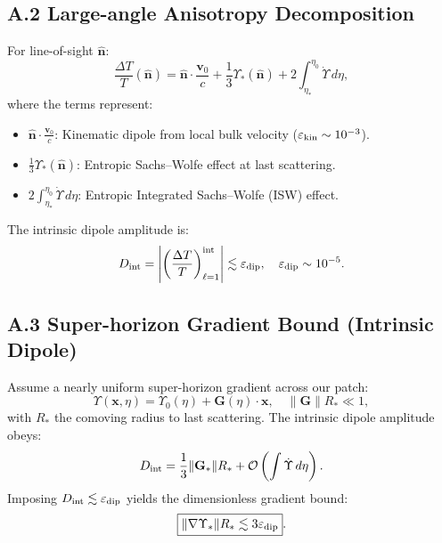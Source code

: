 \documentclass{article}
\begin{document}
{{\subsection*{A.2 Large-angle Anisotropy Decomposition}
For line-of-sight \(\hat{\mathbf{n}}\):
\begin{equation}
\frac{\Delta T}{T}(\hat{\mathbf{n}}) = \hat{\mathbf{n}} \cdot \frac{\mathbf{v}_0}{c} + \frac{1}{3} \Upsilon_*(\hat{\mathbf{n}}) + 2 \int_{\eta_*}^{\eta_0} \dot{\Upsilon} \, d\eta,
\label{eq:anisodecomp}
\end{equation}
where the terms represent:
\begin{itemize}
    \item \(\hat{\mathbf{n}} \cdot \frac{\mathbf{v}_0}{c}\): Kinematic dipole from local bulk velocity (\(\varepsilon_{\rm kin} \sim 10^{-3}\)).
    \item \(\frac{1}{3} \Upsilon_*(\hat{\mathbf{n}})\): Entropic Sachs--Wolfe effect at last scattering.
    \item \(2 \int_{\eta_*}^{\eta_0} \dot{\Upsilon} \, d\eta\): Entropic Integrated Sachs--Wolfe (ISW) effect.
\end{itemize}

The intrinsic dipole amplitude is:
\begin{equation}
D_{\rm int} = \left| \left( \frac{\Delta T}{T} \right)_{\ell=1}^{\rm int} \right| \lesssim \varepsilon_{\rm dip}, \quad \varepsilon_{\rm dip} \sim 10^{-5}.
\end{equation}

\subsection*{A.3 Super-horizon Gradient Bound (Intrinsic Dipole)}
Assume a nearly uniform super-horizon gradient across our patch:
\begin{equation}
\Upsilon(\mathbf{x},\eta) = \Upsilon_0(\eta) + \mathbf{G}(\eta) \cdot \mathbf{x}, \quad \|\mathbf{G}\| R_* \ll 1,
\end{equation}
with \(R_*\) the comoving radius to last scattering. The intrinsic dipole amplitude obeys:
\begin{equation}
D_{\rm int} = \frac{1}{3} \|\mathbf{G}_*\| R_* + \mathcal{O}\left( \int \dot{\Upsilon} \, d\eta \right).
\end{equation}
Imposing \(D_{\rm int} \lesssim \varepsilon_{\rm dip}\) yields the dimensionless gradient bound:
\begin{equation}
\boxed{\|\nabla \Upsilon_*\| R_* \lesssim 3 \varepsilon_{\rm dip}}.
\label{eq:gradbound}
\end{equation}

}}
\end{document}
